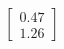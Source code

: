 \documentclass[preview]{standalone}
\begin{document}
\begin{align*}
\begin{bmatrix} 0.47 \\ 1.26 \end{bmatrix}
\end{align*}
\end{document}
